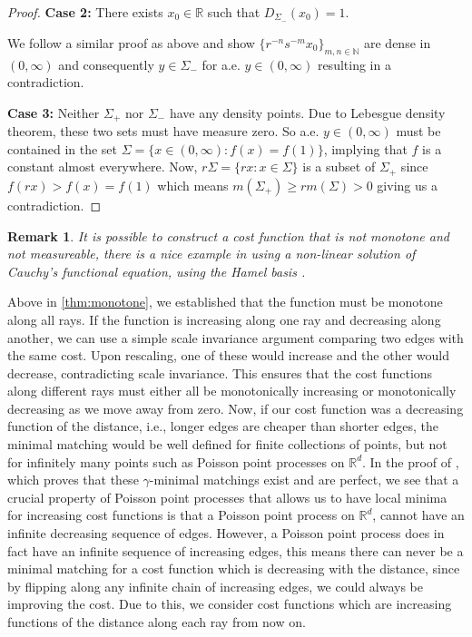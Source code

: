 \documentclass{article}
\newtheorem{remark}{Remark}
\newcommand{\R}{\mathbb{R}}
\newcommand{\N}{\mathbb{N}}
\begin{document}
\begin{proof}[Proof]
    {\bf Case 2:} There exists $x_0\in\R$ such that
    $D_{\Sigma_-}(x_0)=1$.

    We follow a similar proof as above and show $\{r^{-n}
    s^{-m}x_0\}_{m,n\in\N}$ are dense in $(0,\infty)$ and consequently
    $y\in\Sigma_-$ for a.e. $y\in(0,\infty)$ resulting in a contradiction.

    {\bf Case 3:} Neither $\Sigma_+$ nor $\Sigma_-$ have any density
    points. Due to Lebesgue density theorem, these two sets must have
    measure zero.  So a.e. $y\in(0,\infty)$ must be
    contained in the set $\Sigma=\{x\in(0,\infty):f(x)=f(1)\}$,
    implying that $f$ is a constant almost everywhere.
     Now, $r\Sigma = \{rx:x\in\Sigma\} $ is a subset of $ \Sigma_+$ since
    $f(rx)>f(x)=f(1)$ which means $m(\Sigma_+)\geq r m(\Sigma)>0$
    giving us a contradiction.
\end{proof}



\begin{remark}
  It is possible to construct a cost function that is not monotone and
  not measureable, there is a nice example in \cite[Lemma
  2.2]{toure2021scaling} using a non-linear solution of Cauchy's functional
  equation, using the Hamel basis \cite{hamel1905basis}.
\end{remark}


Above in \cref{thm:monotone}, we established that the function must be monotone along all
rays. If the function is increasing along one ray and decreasing
along another, we can use a simple scale invariance argument
comparing two edges with the same cost. Upon rescaling, one of these would
increase and the other would decrease, contradicting scale invariance.
This ensures that the cost functions along different rays must either
all be monotonically
increasing or monotonically decreasing as we move away from zero.
Now, if our cost function was a decreasing function of the distance,
i.e., longer edges are cheaper than shorter edges, the minimal
matching would be well defined for finite collections of points, but
not for infinitely many points such as Poisson point processes on $\R^d$. In the proof
of \cite[Theorem 1]{minimal}, which proves that these $\gamma$-minimal
matchings exist and are perfect, we see that a crucial property of Poisson point
processes that allows us to have local minima for increasing cost functions is
that a Poisson point process on $\R^d$, cannot have an infinite
decreasing sequence of edges. However, a Poisson point process does in fact
have an infinite sequence of increasing edges, this means there can
never be a minimal matching for a cost function which is decreasing
with the distance, since by flipping along any infinite chain of increasing
edges, we could always be improving the cost.
Due to this, we consider cost functions which are increasing functions
of the distance along each ray from now on.
\end{document}
